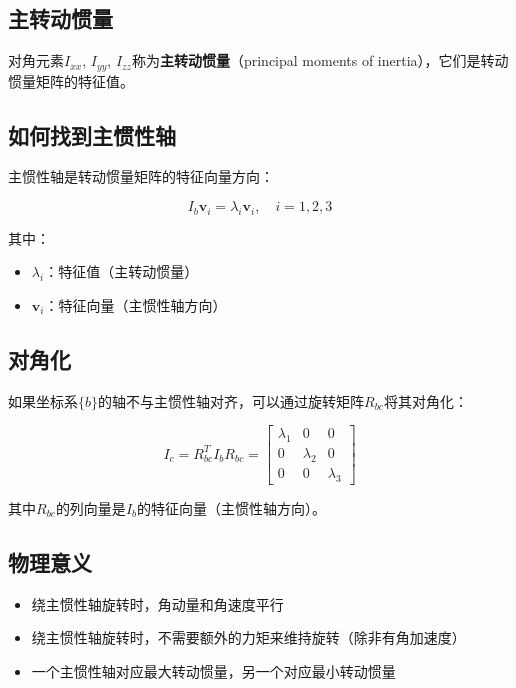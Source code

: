 \documentclass[12pt,a4paper]{article}
\begin{document}
\subsection{主转动惯量}

对角元素$I_{xx}$, $I_{yy}$, $I_{zz}$称为\textbf{主转动惯量}（principal moments of inertia），它们是转动惯量矩阵的特征值。

\subsection{如何找到主惯性轴}

主惯性轴是转动惯量矩阵的特征向量方向：

\begin{equation}
I_b \bm{v}_i = \lambda_i \bm{v}_i, \quad i = 1, 2, 3
\end{equation}

其中：
\begin{itemize}
\item $\lambda_i$：特征值（主转动惯量）
\item $\bm{v}_i$：特征向量（主惯性轴方向）
\end{itemize}

\subsection{对角化}

如果坐标系$\{b\}$的轴不与主惯性轴对齐，可以通过旋转矩阵$R_{bc}$将其对角化：

\begin{equation}
I_c = R_{bc}^T I_b R_{bc} = \begin{bmatrix}
\lambda_1 & 0 & 0 \\
0 & \lambda_2 & 0 \\
0 & 0 & \lambda_3
\end{bmatrix}
\label{eq:diagonalization}
\end{equation}

其中$R_{bc}$的列向量是$I_b$的特征向量（主惯性轴方向）。

\subsection{物理意义}

\begin{itemize}
\item 绕主惯性轴旋转时，角动量和角速度平行
\item 绕主惯性轴旋转时，不需要额外的力矩来维持旋转（除非有角加速度）
\item 一个主惯性轴对应最大转动惯量，另一个对应最小转动惯量
\end{itemize}
\end{document}
